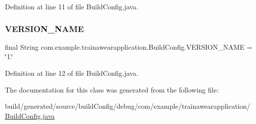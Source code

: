 Definition at line 11 of file Build\+Config.\+java.

\mbox{\label{classcom_1_1example_1_1trainawearapplication_1_1_build_config_a12c3ac31a655a45a92131508009313e2}} 
\subsubsection{\texorpdfstring{VERSION\_NAME}{VERSION\_NAME}}
{\footnotesize\ttfamily final String com.\+example.\+trainawearapplication.\+Build\+Config.\+V\+E\+R\+S\+I\+O\+N\+\_\+\+N\+A\+ME = \char`\"{}1.\char`\"{}\hspace{0.3cm}{\ttfamily [static]}}



Definition at line 12 of file Build\+Config.\+java.



The documentation for this class was generated from the following file\+:\begin{DoxyCompactItemize}
\item 
build/generated/source/build\+Config/debug/com/example/trainawearapplication/\mbox{\hyperlink{_build_config_8java}{Build\+Config.\+java}}\end{DoxyCompactItemize}
